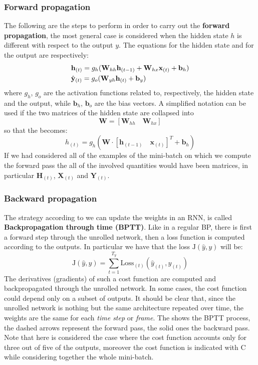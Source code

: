 \subsubsection{Forward propagation}
The following are the steps to perform in order to carry out the \textbf{forward propagation}, the most general case is considered when the hidden state $h$ is different with respect to the output $y$. The equations for the hidden state and for the output are respectively:
\vspace{-0.2cm}
\begin{align}
    \large
    &\mathbf{h}_{(t)}=g_h(\mathbf{W}_{hh} \mathbf{h}_{(t-1)}+\mathbf{W}_{hx}\mathbf{x}_{(t)}+\mathbf{b}_h) \label{eq:hidden_eq}\\
    &\hat{\mathbf{y}}_{(t)}=g_o(\mathbf{W}_{yh}\mathbf{h}_{(t)}+\mathbf{b}_y)\label{eq:output_eq}
\end{align}
where $g_h$, $g_o$ are the activation functions related to, respectively, the hidden state and the output, while $\mathbf{b}_h$, $\mathbf{b}_o$ are the bias vectors. A simplified notation can be used if the two matrices of the hidden state are collapsed into 
\begin{equation*}
    \mathbf{W} = [\mathbf{W}_{hh} \quad \mathbf{W}_{hx}]
\end{equation*} 
so that the  becomes: 
\begin{equation*}
    h_{(t)}=g_h(\mathbf{W}\cdot[\mathbf{h}_{(t-1)} \quad \mathbf{x}_{(t)}]^T+\mathbf{b}_h)
\end{equation*}
If we had considered all of the examples of the mini-batch on which we compute the forward pass the all of the involved quantities would have been matrices, in particular $\mathbf{H}_{(t)}$, $\mathbf{X}_{(t)}$ and $\mathbf{Y}_{(t)}$.


\subsubsection{Backward propagation}
The strategy according to we can update the weights in an RNN, is called \textbf{Backpropagation through time (BPTT)}. Like in a regular BP, there is first a forward step through the unrolled network, then a loss function is computed according to the outputs. In particular we have that the loss $\text{J}(\hat{y},y)$ will be: 
\begin{equation}
    \text{J}(\hat{y},y)=\sum_{t=1}^{T_y} {\text{Loss}_{(t)}(\hat{y}_{(t)}, y_{(t)})}
\end{equation}
The derivatives (gradients) of such a cost function are computed and backpropagated through the unrolled network. In some cases, the cost function could depend only on a subset of outputs. It should be clear that, since the unrolled network is nothing but the same architecture repeated over time, the weights are the same for each \textit{time step} or \textit{frame}. The  shows the BPTT process, the dashed arrows represent the forward pass, the solid ones the backward pass. Note that here is considered the case where the cost function accounts only for three out of five of the outputs, moreover the cost function is indicated with C while considering together the whole mini-batch.


